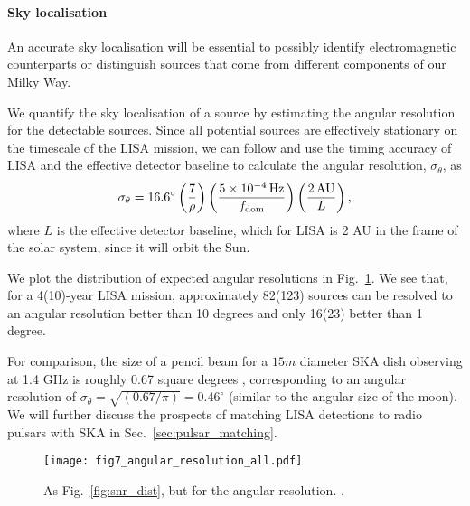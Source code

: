 \paragraph{Sky localisation}

An accurate sky localisation will be essential to possibly identify electromagnetic counterparts or distinguish sources that come from different components of our Milky Way. 

We quantify the sky localisation of a source by estimating the angular resolution for the detectable sources. Since all potential sources are effectively stationary on the timescale of the LISA mission, we can follow \citet{Mandel+2018} and use the timing accuracy of LISA and the effective detector baseline to calculate the angular resolution, $\sigma_{\theta}$, as
\begin{equation}
    \sigma_{\theta} = 16.6^\circ \left(\frac{7}{\rho}\right) \left(\frac{5 \times 10^{-4} \unit{Hz}}{f_{\rm dom}}\right) \left( \frac{2 \unit{AU}}{L} \right),
\end{equation}
where $L$ is the effective detector baseline, which for LISA is 2 AU in the frame of the solar system, since it will orbit the Sun.

We plot the distribution of expected angular resolutions in Fig.~\ref{fig:ang_res}. We see that, for a 4(10)-year LISA mission, approximately 82(123) sources can be resolved to an angular resolution better than 10 degrees and only 16(23) better than 1 degree. 

For comparison, the size of a pencil beam for a $15 \unit{m}$ diameter SKA dish observing at 1.4 GHz is roughly 0.67 square degrees \citep{Smits+2009}, corresponding to an angular resolution of $\sigma_\theta = \sqrt{(0.67 / \pi)} = 0.46^\circ$ (similar to the angular size of the moon). We will further discuss the prospects of matching LISA detections to radio pulsars with SKA in Sec.~\ref{sec:pulsar_matching}.

\begin{figure}[htb]
    \centering
    \texttt{[image: fig7\_angular\_resolution\_all.pdf]}
    \caption{As Fig.~\ref{fig:snr_dist}, but for the angular resolution. \href{https://github.com/TomWagg/detecting-DCOs-in-LISA/blob/main/paper/figures/fig7_angular_resolution_all.pdf}{\faFileImage} \href{https://github.com/TomWagg/detecting-DCOs-in-LISA/blob/main/paper/figure_notebooks/fiducial.ipynb}{\faBook}.}
    \label{fig:ang_res}
\end{figure}